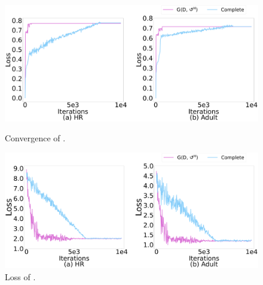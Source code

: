 \begin{figure}[t]   
	\centering
	\begin{minipage}[t]{0.49\textwidth}
		\centering
		\includegraphics[width=\columnwidth]{figs/G_a}
		\caption{Convergence of \ours.}
		\label{fig:converge_G}
	\end{minipage}
	\begin{minipage}[t]{0.49\textwidth}
		\centering
		\includegraphics[width=\columnwidth]{figs/G}
		\caption{Loss of \ours.}
		\label{fig:real_loss_G}
	\end{minipage}
	\vspace*{-1em}   
\end{figure}

